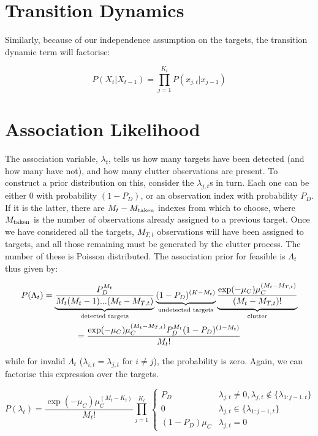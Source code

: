 \section{Transition Dynamics}
Similarly, because of our independence assumption on the targets, the transition dynamic term will factorise:

\begin{equation}
P(X_t|X_{t-1}) = \prod_{j=1}^{K_t} P(x_{j,t}|x_{j-1})
\label{eq:MTFactorisedTransition}
\end{equation}



\section{Association Likelihood}
The association variable, $\lambda_t$, tells us how many targets have been detected (and how many have not), and how many clutter observations are present. To construct a prior distribution on this, consider the $\lambda_{j,t}$s in turn. Each one can be either 0 with probability $(1-P_D)$, or an observation index with probability $P_D$. If it is the latter, there are $M_t - M_{\textnormal{taken}}$ indexes from which to choose, where $M_{\textnormal{taken}}$ is the number of observations already assigned to a previous target. Once we have considered all the targets, $M_{T,t}$ observations will have been assigned to targets, and all those remaining must be generated by the clutter process. The number of these is Poisson distributed. The association prior for feasible is $\Lambda_t$ thus given by:

\begin{multline}
P(\Lambda_t) = \underbrace{\frac{P_D^{M_t}}{M_t(M_t-1)...(M_t-M_{T,t})}}_\textnormal{detected targets} \underbrace{(1-P_D)^{(K-M_t)}}_\textnormal{undetected targets} \underbrace{\frac{\exp(-\mu_C) \mu_C^{(M_t-M_{T,t})}}{(M_t-M_{T,t})!}}_\textnormal{clutter} \\
= \frac{ \exp(-\mu_C) \mu_C^{(M_t-M_{T,t})} P_D^{M_t} (1-P_D)^{(1-M_t)} }{ M_t! }
\label{eq:MTAssociationLikelihood}
\end{multline}

while for invalid $\Lambda_t$ ($\lambda_{i,t}=\lambda_{j,t}$ for $i \ne j$), the probability is zero. Again, we can factorise this expression over the targets.

\begin{equation}
P(\lambda_t) = \frac{\exp(-\mu_C) \mu_C^{(M_t-K_t)}}{M_t!} \prod_{j=1}^{K_t} \begin{cases} P_D & \lambda_{j,t} \ne 0, \lambda_{j,t} \notin \{ \lambda_{1:j-1,t} \} \\ 0 & \lambda_{j,t} \in \{ \lambda_{1:j-1,t} \} \\ (1-P_D) \mu_C & \lambda_{j,t}=0 \end{cases}
\label{eq:MTFactorisedAssociationLikelihood}
\end{equation}


